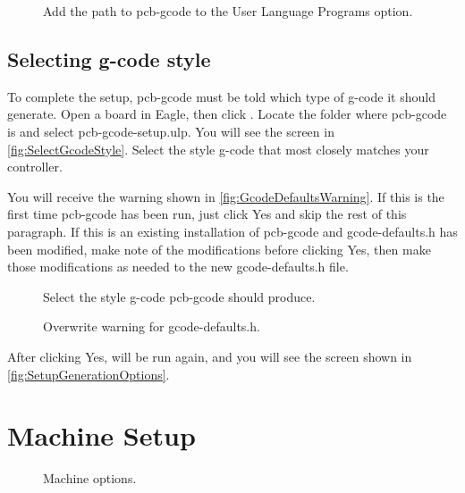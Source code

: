 \documentclass[11pt]{book}
\begin{document}
\begin{figure}
	\caption{Add the path to pcb-gcode to the User Language Programs option.}
	\label{fig:EagleOptionsDirectories}
\end{figure}

\subsection{Selecting g-code style}\label{sub:SelectingGCodeStyle}
To complete the setup, pcb-gcode must be told which type of g-code it should generate. Open a board in Eagle, then click . Locate the folder where pcb-gcode is and select pcb-gcode-setup.ulp. You will see the screen in \figurename \vref{fig:SelectGcodeStyle}. Select the style g-code that most closely matches your controller.

You will receive the warning shown in \figurename \vref{fig:GcodeDefaultsWarning}. If this is the first time pcb-gcode has been run, just click Yes and skip the rest of this paragraph. If this is an existing installation of pcb-gcode and gcode-defaults.h has been modified, make note of the modifications before clicking Yes, then make those modifications as needed to the new gcode-defaults.h file.

\begin{figure}
	\caption{Select the style g-code pcb-gcode should produce.}
	\label{fig:SelectGcodeStyle}
\end{figure}

\begin{figure}
	\caption{Overwrite warning for gcode-defaults.h.}
	\label{fig:GcodeDefaultsWarning}
\end{figure}

After clicking Yes,  will be run again, and you will see the screen shown in \figurename \vref{fig:SetupGenerationOptions}.

%
%
\section{Machine Setup}\label{sec:MachineSetup}

\begin{figure}
	\caption{Machine options.}
	\label{fig:SetupMachine}
\end{figure}
\end{document}
